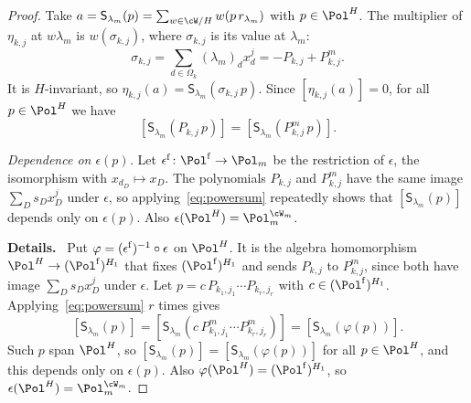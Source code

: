 \documentclass[11pt]{amsart}
\newenvironment{details}{\par\color{black!60!green}\noindent\textbf{Details.}\ }{\par}
\begin{document}
\begin{proof}
Take $a=\mathsf S_{\lambda_m}(p)=\sum_{w\in\cW/H}w(p\,r_{\lambda_m})$ with
$p\in\Pol^H$.  The multiplier of $\eta_{k,j}$ at $w\lambda_m$ is
$w(\sigma_{k,j})$, where $\sigma_{k,j}$ is its value at $\lambda_m$:
\[
 \sigma_{k,j}=\sum_{d\in\Omega_k}(\lambda_m)_dx_d^j
 =-P_{k,j}+P^m_{k,j}.
\]
It is $H$-invariant, so $\eta_{k,j}(a)=\mathsf S_{\lambda_m}(\sigma_{k,j}\,p)$.
Since $[\eta_{k,j}(a)]=0$, for all $p\in\Pol^H$ we have
\begin{equation}\label{eq:powersum}
 [\mathsf S_{\lambda_m}(P_{k,j}\,p)]=[\mathsf S_{\lambda_m}(P^m_{k,j}\,p)].
\end{equation}

\emph{Dependence on $\epsilon(p)$.}  Let $\epsilon^{\rm f}\colon\Pol^{\rm f}\to\Pol_m$ be the restriction of
$\epsilon$, the isomorphism with $x_{d_D}\mapsto x_D$.  The polynomials
$P_{k,j}$ and $P^m_{k,j}$ have the same image $\sum_Ds_Dx_D^j$ under
$\epsilon$, so applying~\eqref{eq:powersum} repeatedly shows that $[\mathsf
S_{\lambda_m}(p)]$ depends only on $\epsilon(p)$.  Also
$\epsilon(\Pol^H)=\Pol_m^{\cW_m}$.
\begin{details}
Put
$\varphi=(\epsilon^{\rm f})^{-1}\circ\epsilon$ on $\Pol^H$.  It is the algebra
homomorphism $\Pol^H\to(\Pol^{\rm f})^{H_1}$ that fixes $(\Pol^{\rm f})^{H_1}$
and sends $P_{k,j}$ to $P^m_{k,j}$, since both have image
$\sum_Ds_Dx_D^j$ under $\epsilon$.  Let $p=c\,P_{k_1,j_1}\cdots
P_{k_r,j_r}$ with $c\in(\Pol^{\rm f})^{H_1}$.  Applying~\eqref{eq:powersum}
$r$ times gives
\[
 [\mathsf S_{\lambda_m}(p)]=[\mathsf S_{\lambda_m}(c\,P^m_{k_1,j_1}\cdots
 P^m_{k_r,j_r})]=[\mathsf S_{\lambda_m}(\varphi(p))].
\]
Such $p$ span $\Pol^H$, so $[\mathsf S_{\lambda_m}(p)]=[\mathsf
S_{\lambda_m}(\varphi(p))]$ for all $p\in\Pol^H$, and this depends only on
$\epsilon(p)$.  Also $\varphi(\Pol^H)=(\Pol^{\rm f})^{H_1}$, so
$\epsilon(\Pol^H)=\Pol_m^{\cW_m}$.
\end{details}


\end{proof}
\end{document}
